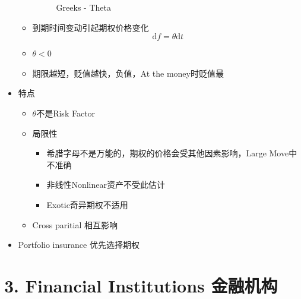 \documentclass[a4paper,6pt,twoside,openany]{article}
\begin{document}
\begin{itemize}
\begin{itemize}
\begin{figure}[ht!]
      \caption{Greeks - Theta}
    \end{figure}
  \item 到期时间变动引起期权价格变化 $$\mathrm{d}f = \theta \mathrm{d}t$$
  \item $\theta < 0$
  \item 期限越短，贬值越快，负值，At the money时贬值最
  \end{itemize}
\item 特点
  \begin{itemize}
  \item $\theta$不是Risk Factor
  \item 局限性
    \begin{itemize}
    \item 希腊字母不是万能的，期权的价格会受其他因素影响，Large Move中不准确
    \item 非线性Nonlinear资产不受此估计
    \item Exotic奇异期权不适用
    \end{itemize}
  \item Cross paritial 相互影响
  \end{itemize}
\item Portfolio insurance 优先选择期权
\end{itemize}

        

\newpage

\section*{3. Financial Institutions 金融机构}
\end{document}
